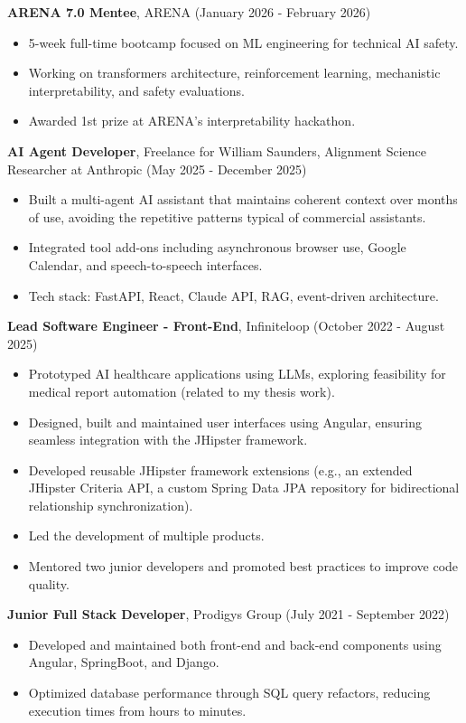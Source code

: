 \documentclass[a4paper,9pt]{article}
\begin{document}
{    \item \textbf{ARENA 7.0 Mentee}, ARENA (January 2026 - February 2026)
    \begin{itemize}
        \item 5-week full-time bootcamp focused on ML engineering for technical AI safety.
        \item Working on transformers architecture, reinforcement learning, mechanistic interpretability, and safety evaluations.
        \item Awarded 1st prize at ARENA’s interpretability hackathon.
    \end{itemize}

    \item \textbf{AI Agent Developer}, Freelance for William Saunders, Alignment Science Researcher at Anthropic (May 2025 - December 2025)
    \begin{itemize}
        \item Built a multi-agent AI assistant that maintains coherent context over months of use, avoiding the repetitive patterns typical of commercial assistants.
        \item Integrated tool add-ons including asynchronous browser use, Google Calendar, and speech-to-speech interfaces.
        \item Tech stack: FastAPI, React, Claude API, RAG, event-driven architecture.
    \end{itemize}
    \item \textbf{Lead Software Engineer - Front-End}, Infiniteloop (October 2022 - August 2025)
    \begin{itemize}
        \item Prototyped AI healthcare applications using LLMs, exploring feasibility for medical report automation (related to my thesis work).
        \item Designed, built and maintained user interfaces using Angular, ensuring seamless integration with the JHipster framework.
        \item Developed reusable JHipster framework extensions (e.g., an extended JHipster Criteria API, a custom Spring Data JPA repository for bidirectional relationship synchronization).
        \item Led the development of multiple products. 
        \item Mentored two junior developers and promoted best practices to improve code quality.
    \end{itemize}
    \item \textbf{Junior Full Stack Developer}, Prodigys Group (July 2021 - September 2022)
    \begin{itemize}
        \item Developed and maintained both front-end and back-end components using Angular, SpringBoot, and Django.
        \item Optimized database performance through SQL query refactors, reducing execution times from hours to minutes.
    \end{itemize}
}
\end{document}
